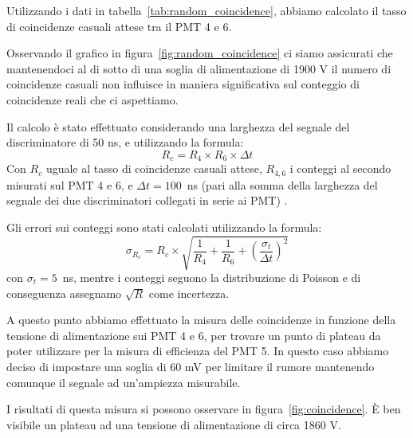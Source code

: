 \documentclass[a4paper,10pt]{article}
\begin{document}
Utilizzando i dati in tabella~\ref{tab:random_coincidence}, abbiamo calcolato il tasso di coincidenze casuali attese tra il PMT 4 e 6.

Osservando il grafico in figura~\ref{fig:random_coincidence} ci siamo assicurati che mantenendoci al di sotto di una soglia di alimentazione di 1900 V il numero di coincidenze casuali non influisce in maniera significativa sul conteggio di coincidenze reali che ci aspettiamo.  

Il calcolo è stato effettuato considerando una larghezza del segnale del discriminatore di 50 ns, e utilizzando la formula:
\begin{equation}
R_{c} = R_{4} \times R_{6} \times \Delta t
\label{eq:random_coincidence}
\end{equation}
Con $R_{c}$ uguale al tasso di coincidenze casuali attese, $R_{4,6}$ i conteggi al secondo misurati sul PMT 4 e 6, e $\Delta t = 100$~ns (pari alla somma della larghezza del segnale dei due discriminatori collegati in serie ai PMT) .

Gli errori sui conteggi sono stati calcolati utilizzando la formula:
\begin{equation}
\sigma_{R_{c}} = R_{c} \times{\sqrt{\frac{1}{R_{4}} + \frac{1}{R_{6}} + \left( \frac{\sigma_{t}}{\Delta t} \right)^2}  }
\end{equation}
con $\sigma_{t} = 5$~ns, mentre i conteggi seguono la distribuzione di Poisson e di conseguenza assegnamo $\sqrt{R}$ come incertezza.

A questo punto abbiamo effettuato la misura delle coincidenze in funzione della tensione di alimentazione sui PMT 4 e 6, per trovare un punto di plateau da poter utilizzare per la misura di efficienza del PMT 5.
In questo caso abbiamo deciso di impostare una soglia di 60 mV per limitare il rumore mantenendo comunque il segnale ad un'ampiezza misurabile. 

I risultati di questa misura si possono osservare in figura~\ref{fig:coincidence}. \`E ben visibile un plateau ad una tensione di alimentazione di circa 1860 V.	
\end{document}

